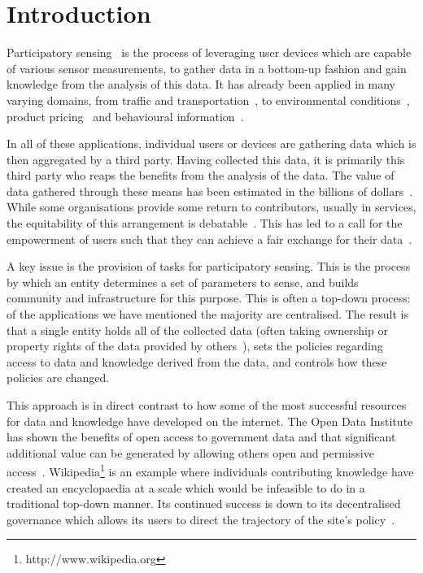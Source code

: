 \chapter{Introduction}\label{ch:introduction}

Participatory sensing~\cite{Burke2006} is the process of leveraging user devices which are capable of various sensor measurements, to gather data in a bottom-up fashion and gain knowledge from the analysis of this data. 
It has already been applied in many varying domains, from traffic and transportation~\cite{Costa2012,Mathur2010}, to environmental conditions~\cite{Hasenfratz2012,Mendez2011}, product pricing~\cite{Deng2009} and behavioural information~\cite{Miluzzo2008}.

In all of these applications, individual users or devices are gathering data which is then aggregated by a third party. Having collected this data, it is primarily this third party who reaps the benefits from the analysis of the data. The value of data gathered through these means has been estimated in the billions of dollars~\cite{Manyika2011}. While some organisations provide some return to contributors, usually in services, the equitability of this arrangement is debatable~\cite{VanDijck2009}. This has led to a call for the empowerment of users such that they can achieve a fair exchange for their data~\cite{BuckinghamShum2012}.

A key issue is the provision of tasks for participatory sensing. This is the process by which an entity determines a set of parameters to sense, and builds community and infrastructure for this purpose.
This is often a top-down process: of the applications we have mentioned the majority are centralised. The result is that a single entity holds all of the collected data (often taking ownership or property rights of the data provided by others~\cite{ohara2010}), sets the policies regarding access to data and knowledge derived from the data, and controls how these policies are changed.

This approach is in direct contrast to how some of the most successful resources for data and knowledge have developed on the internet. 
The Open Data Institute has shown the benefits of open access to government data and that significant additional value can be generated by allowing others open and permissive access~\cite{Shadbolt2012}. 
Wikipedia\footnote{http://www.wikipedia.org} is an example where individuals contributing knowledge have created an encyclopaedia at a scale which would be infeasible to do in a traditional top-down manner. 
Its continued success is down to its decentralised governance which allows its users to direct the trajectory of the site's policy~\cite{Famiglietti2011}.

